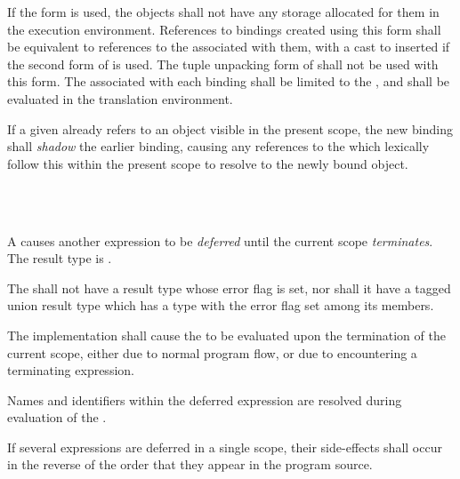 \specsubsubitem
If the  form is used, the objects shall not have any storage
allocated for them in the execution environment. References to bindings created
using this form shall be equivalent to references to the
 associated with them, with a cast to 
inserted if the second form of  is used. The tuple
unpacking form of  shall not be used with this form. The
 associated with each binding shall be limited to
the , and shall be evaluated in
the translation environment.

\specsubsubitem
If a given  already refers to an object visible in the present
scope, the new binding shall \textit{shadow} the earlier binding, causing any
references to the  which lexically follow this
 within the present scope to resolve to the newly
bound object.


\begin{grammar}
 \\
	  \\
\end{grammar}

\specsubsubitem
A  causes another expression to be
\textit{deferred} until the current scope \textit{terminates}. The result type
is .

\specsubsubitem
The  shall not have a result type whose error flag is
set, nor shall it have a tagged union result type which has a type with the
error flag set among its members.

\specsubsubitem
The implementation shall cause the  to be evaluated
upon the termination of the current scope, either due to normal program flow,
or due to encountering a terminating expression.

\specsubsubitem
Names and identifiers within the deferred expression are resolved during
evaluation of the .


\specsubsubitem
If several expressions are deferred in a single scope, their side-effects shall
occur in the reverse of the order that they appear in the program source.

